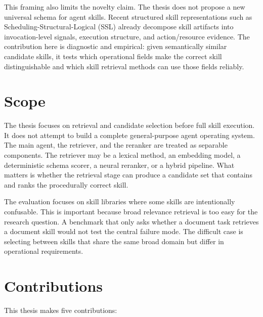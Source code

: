This framing also limits the novelty claim. The thesis does not propose a new universal schema for agent skills. Recent structured skill representations such as Scheduling-Structural-Logical (SSL) already decompose skill artifacts into invocation-level signals, execution structure, and action/resource evidence. The contribution here is diagnostic and empirical: given semantically similar candidate skills, it tests which operational fields make the correct skill distinguishable and which skill retrieval methods can use those fields reliably.

\section{Scope}

The thesis focuses on retrieval and candidate selection before full skill execution. It does not attempt to build a complete general-purpose agent operating system. The main agent, the retriever, and the reranker are treated as separable components. The retriever may be a lexical method, an embedding model, a deterministic schema scorer, a neural reranker, or a hybrid pipeline. What matters is whether the retrieval stage can produce a candidate set that contains and ranks the procedurally correct skill.

The evaluation focuses on skill libraries where some skills are intentionally confusable. This is important because broad relevance retrieval is too easy for the research question. A benchmark that only asks whether a document task retrieves a document skill would not test the central failure mode. The difficult case is selecting between skills that share the same broad domain but differ in operational requirements.

\section{Contributions}

This thesis makes five contributions:

